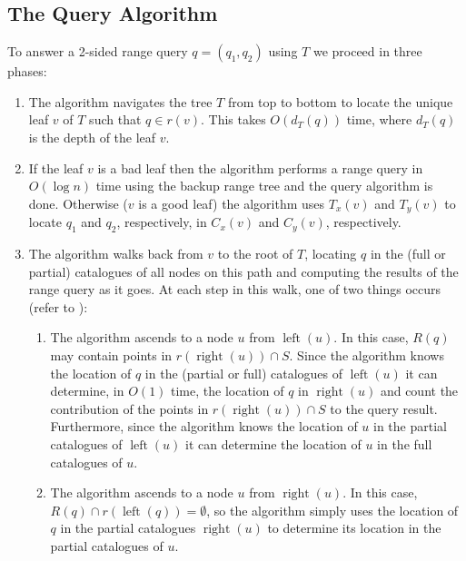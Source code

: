 \documentclass[lotsofwhite,charterfonts]{patmorin}
\DeclareMathOperator{\lft}{left}
\DeclareMathOperator{\rght}{right}
\begin{document}
\subsection{The Query Algorithm}

To answer a 2-sided range query $q=(q_1,q_2)$ using $T$ we proceed in
three phases:

\begin{enumerate}

\item The algorithm navigates the tree $T$ from top to bottom to
locate the unique leaf $v$ of $T$ such that $q\in r(v)$.  This takes
$O(d_T(q))$ time, where $d_T(q)$ is the depth of the leaf $v$.

\item If the leaf $v$ is a bad leaf then the algorithm performs a
range query in $O(\log n)$ time using the backup range tree and the
query algorithm is done.  Otherwise ($v$ is a good leaf) the algorithm
uses $T_x(v)$ and $T_y(v)$ to locate $q_1$ and $q_2$, respectively, in
$C_x(v)$ and $C_y(v)$, respectively.

\item The algorithm walks back from $v$ to the root of $T$, locating
$q$ in the (full or partial) catalogues of all nodes on this path and
computing the results of the range query as it goes.  At each step in
this walk, one of two things occurs (refer to ):
\begin{enumerate}

\item The algorithm ascends to a node $u$ from $\lft(u)$.  In this
case, $R(q)$ may contain points in $r(\rght(u))\cap S$.  Since the
algorithm knows the location of $q$ in the (partial or full)
catalogues of $\lft(u)$ it can determine, in $O(1)$ time, the location
of $q$ in $\rght(u)$ and count the contribution of the points in
$r(\rght(u))\cap S$ to the query result.  Furthermore, since the
algorithm knows the location of $u$ in the partial catalogues of
$\lft(u)$ it can determine the location of $u$ in the full catalogues
of $u$.

\item The algorithm ascends to a node $u$ from $\rght(u)$.  In this
case, $R(q)\cap r(\lft(q))=\emptyset$, so the algorithm simply uses
the location of $q$ in the partial catalogues $\rght(u)$ to determine
its location in the partial catalogues of $u$.  \end{enumerate} 

\end{enumerate}
\end{document}
